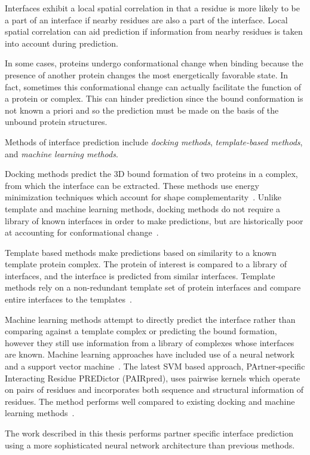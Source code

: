 Interfaces exhibit a local spatial correlation in that a residue is more likely to be a part of an interface if nearby residues are also a part of the interface. 
Local spatial correlation can aid prediction if information from nearby residues is taken into account during prediction.

In some cases, proteins undergo conformational change when binding because the presence of another protein changes the most energetically favorable state. 
In fact, sometimes this conformational change can actually facilitate the function of a protein or complex.
This can hinder prediction since the bound conformation is not known a priori and so the prediction must be made on the basis of the unbound protein structures. 

Methods of interface prediction include \textit{docking methods}, \textit{template-based methods}, and \textit{machine learning methods}.

Docking methods predict the 3D bound formation of two proteins in a complex, from which the interface can be extracted. 
These methods use energy minimization techniques which account for shape complementarity~\cite{chen2003}\cite{zundert2016}.
Unlike template and machine learning methods, docking methods do not require a library of known interfaces in order to make predictions, but are historically poor at accounting for conformational change~\cite{ezkurdia2009}.

Template based methods make predictions based on similarity to a known template protein complex.
The protein of interest is compared to a library of interfaces, and the interface is predicted from similar interfaces.
Template methods rely on a non-redundant template set of protein interfaces and compare entire interfaces to the templates~\cite{tuncbag2011}.

Machine learning methods attempt to directly predict the interface rather than comparing against a template complex or predicting the bound formation, however they still use information from a library of complexes whose interfaces are known.
Machine learning approaches have included use of a neural network~\cite{ahmad2011} and a support vector machine~\cite{minhas2014}.
The latest SVM based approach, PArtner-specific Interacting Residue PREDictor (PAIRpred), uses pairwise kernels which operate on pairs of residues and incorporates both sequence and structural information of residues.
The method performs well compared to existing docking and machine learning methods~\cite{minhas2014}.



The work described in this thesis performs partner specific interface prediction using a more sophisticated neural network architecture than previous methods. 




